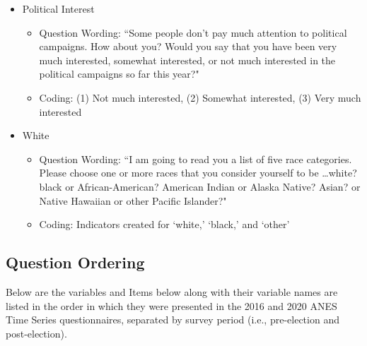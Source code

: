 \begin{itemize}
	\item Political Interest
		\begin{itemize}
			\item Question Wording: ``Some people don't pay much attention to political campaigns. How about you? Would you say that you have been very much interested, somewhat interested, or not much interested in the political campaigns so far this year?"
			\item Coding: (1) Not much interested, (2) Somewhat interested, (3) Very much interested
		\end{itemize}
		
	\item White 
		\begin{itemize}
			\item Question Wording: ``I am going to read you a list of five race categories. Please choose one or more races that you consider yourself to be \ldots white? black or African-American? American Indian or Alaska Native? Asian? or Native Hawaiian or other Pacific Islander?"
			\item Coding: Indicators created for `white,' `black,' and `other'
		\end{itemize}
\end{itemize}


\subsection{Question Ordering}\label{si:item-ordering} %
Below are the variables and 
Items below along with their variable names are listed in the order in which they were presented in the 2016 and 2020 ANES Time Series questionnaires, separated by survey period (i.e., pre-election and post-election).

